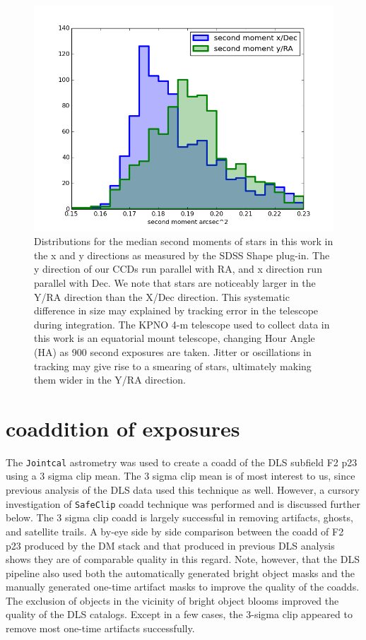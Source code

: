 \documentclass[modern]{aastex61}
\begin{document}
\begin{figure}
    \includegraphics[width=.9\textwidth]{second_moments.png}
    \caption{Distributions for the median second moments of stars in this work in the x and y directions as measured by the SDSS Shape plug-in. The y direction of our CCDs run parallel with RA, and x direction run parallel with Dec. We note that stars are noticeably larger in the Y/RA direction than the X/Dec direction. This systematic difference in size may explained by tracking error in the telescope during integration. The KPNO 4-m telescope used to collect data in this work is an equatorial mount telescope, changing Hour Angle (HA) as 900 second exposures are taken. Jitter or oscillations in tracking may give rise to a smearing of stars, ultimately making them wider in the Y/RA direction.}
\end{figure}

\section{coaddition of exposures}
The {\tt\string Jointcal} astrometry was used to create a coadd of the DLS subfield F2 p23 using a 3 sigma clip mean. The 3 sigma clip mean is of most interest to us, since previous analysis of the DLS data used this technique as well. However, a cursory investigation of {\tt\string SafeClip} coadd technique was performed and is discussed further below. 
The 3 sigma clip coadd is largely successful in removing artifacts, ghosts, and satellite trails. A by-eye side by side comparison between the coadd of F2 p23 produced by the DM stack and that produced in previous DLS analysis shows they are of comparable quality in this regard.
Note, however, that the DLS pipeline also used both the automatically generated bright object masks and the manually generated one-time artifact masks to improve the quality of the coadds. The exclusion of objects in the vicinity of bright object blooms improved the quality of the DLS catalogs. Except in a few cases, the 3-sigma clip appeared to remove most one-time artifacts successfully.
\end{document}
